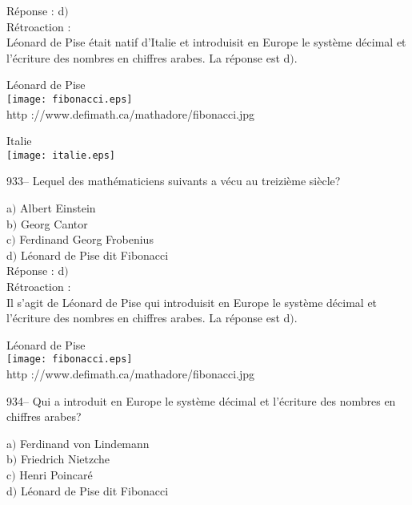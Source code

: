 ﻿\documentclass[letterpaper, 12pt]{article}
\begin{document}
R\'eponse : d$)$\\

R\'etroaction : \\
L\'eonard de Pise \'etait natif d'Italie et introduisit en Europe le
syst\`eme d\'ecimal et l'\'ecriture
des nombres en chiffres arabes. La r\'eponse est d$)$.\\

        \begin{center}
        L\'eonard de Pise\\
    \texttt{[image: fibonacci.eps]}\\
        {\footnotesize http ://www.defimath.ca/mathadore/fibonacci.jpg}
    \end{center}

        \begin{center}
        Italie\\
    \texttt{[image: italie.eps]}\\
    \end{center}

933-- Lequel des math\'ematiciens suivants a v\'ecu au treizi\`eme
si\`ecle?

a$)$ Albert Einstein \\
b$)$ Georg Cantor \\
c$)$ Ferdinand Georg Frobenius \\
d$)$ L\'eonard de Pise dit Fibonacci\\

R\'eponse : d$)$\\

R\'etroaction :\\
Il s'agit de L\'eonard de Pise qui introduisit en Europe le
syst\`eme d\'ecimal et l'\'ecriture
des nombres en chiffres arabes. La r\'eponse est d$)$.\\

        \begin{center}
        L\'eonard de Pise\\
    \texttt{[image: fibonacci.eps]}\\
        {\footnotesize http ://www.defimath.ca/mathadore/fibonacci.jpg}
    \end{center}

934-- Qui a introduit en Europe le syst\`eme d\'ecimal et
l'\'ecriture des nombres en chiffres arabes?

a$)$ Ferdinand von Lindemann \\
b$)$ Friedrich Nietzche \\
c$)$ Henri Poincar\'e \\
d$)$ L\'eonard de Pise dit Fibonacci\\
\end{document}
